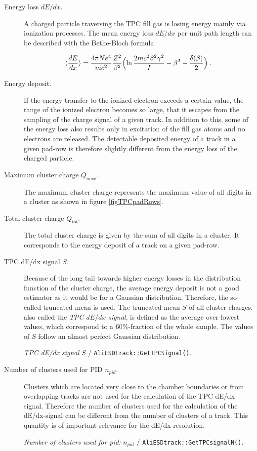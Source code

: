 \documentclass[12pt]{article}
\begin{document}
\begin{description}

	\item[Energy loss $dE/dx$.] A charged particle traversing the TPC fill gas is losing energy mainly via ionization processes. The mean energy loss $dE/dx$ per unit path length can be described with the Bethe-Bloch formula
	
\begin{equation}
 \langle{dE\over dx}\rangle = {4\pi N e^{4} \over mc^{2}} {Z^{2} \over \beta^{2}} \Bigl(\ln{2mc^{2}\beta^{2}\gamma^{2} \over I} - \beta^{2} - {\delta(\beta) \over 2} \Bigr) \; .
 \label{eq.:Bethe}
\end{equation}

	\item[Energy deposit.] If the energy transfer to the ionized electron exceeds a certain value, the range of the ionized electron becomes so large, that it escapes from the sampling of the charge signal of a given track. In addition to this, some of the energy loss also results only in excitation of the fill gas atoms and no electrons are released. The detectable deposited energy of a track in a given pad-row is therefore slightly different from the energy loss of the charged particle.
	
	\item[Maximum cluster charge $Q_{max}$.] The maximum cluster charge represents the maximum value of all digits in a cluster as shown in figure \ref{figTPCpadRows}.
	
	\item[Total cluster charge $Q_{tot}$.] The total cluster charge is given by the sum of all digits in a cluster. It corresponds to the energy deposit of a track on a given pad-row.
	
	\item[TPC dE/dx signal $S$.] Because of the long tail towards higher energy losses in the distribution function of the cluster charge, the average energy deposit is not a good estimator as it would be for a Gaussian distribution. Therefore, the so-called truncated mean is used. The truncated mean $S$ of all cluster charges, also called the {\it TPC $dE/dx$ signal}, is defined as the average over lowest values, which correspond to a 60\%-fraction of the whole sample.  The values of $S$ follow an almost perfect Gaussian distribution.

\medskip
		{\it TPC dE/dx signal $S$} / {\tt AliESDtrack::GetTPCSignal()}.
\medskip
	
	\item[Number of clusters used for PID $n_{pid}$.] Clusters which are located very close to the chamber boundaries or from overlapping tracks are not used for the calculation of the TPC dE/dx signal. Therefore the number of clusters used for the calculation of the dE/dx-signal can be different from the number of clusters of a track. This quantity is of important relevance for the dE/dx-resolution.
	
	{\it Number of clusters used for pid:} $n_{pid}$ / {\tt AliESDtrack::GetTPCsignalN()}.
	
\end{description}
\end{document}
